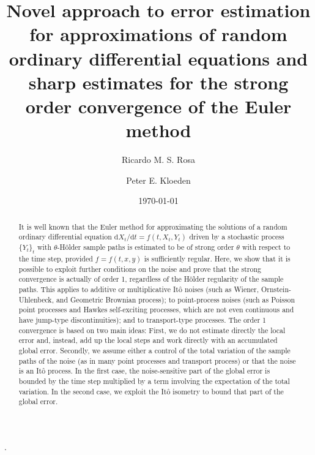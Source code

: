 \documentclass[reqno,12pt]{amsart}
\theoremstyle{plain}%
\theoremstyle{definition}
\begin{document}


\title[Strong order convergence of Euler for Random ODEs]{Novel approach to error estimation for approximations of random ordinary differential equations and sharp estimates for the strong order convergence of the Euler method}

\author[R. M. S. Rosa]{Ricardo M. S. Rosa}

\author[P. E. Kloeden]{Peter E. Kloeden}

\address[Ricardo M. S. Rosa]{Instituto de Matem\'atica, Universidade Federal do Rio de Janeiro, Brazil}
\address[Peter E. Kloeden]{Mathematics Department, University of Tubingen, Germany}


\date{\today}


.

\begin{abstract}
It is well known that the Euler method for approximating the solutions of a random ordinary differential equation $\mathrm{d}X_t/\mathrm{d}t = f(t, X_t, Y_t)$ driven by a stochastic process $\{Y_t\}_t$ with $\theta$-H\"older sample paths is estimated to be of strong order $\theta$ with respect to the time step, provided $f=f(t, x, y)$ is sufficiently regular. Here, we show that it is possible to exploit further conditions on the noise and prove that the strong convergence is actually of order 1, regardless of the H\"older regularity of the sample paths. This applies to additive or multiplicative It\^o noises (such as Wiener, Ornstein-Uhlenbeck, and Geometric Brownian process); to point-process noises (such as Poisson point processes and Hawkes self-exciting processes, which are not even continuous and have jump-type discontinuities); and to transport-type processes. The order 1 convergence is based on two main ideas: First, we do not estimate directly the local error and, instead, add up the local steps and work directly with an accumulated global error. Secondly, we assume either a control of the total variation of the sample paths of the noise (as in many point processes and transport process) or that the noise is an It\^o process. In the first case, the noise-sensitive part of the global error is bounded by the time step multiplied by a term involving the expectation of the total variation. In the second case, we exploit the It\^o isometry to bound that part of the global error.
\end{abstract}
\end{document}
